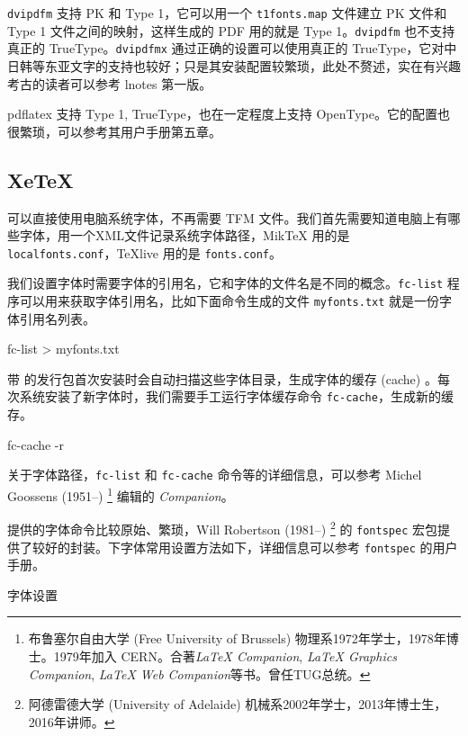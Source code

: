 \texttt{dvipdfm} 支持 PK 和 Type 1，它可以用一个 \texttt{t1fonts.map} 文件建立 PK 文件和 Type 1 文件之间的映射，这样生成的 PDF 用的就是 Type 1。\texttt{dvipdfm} 也不支持真正的 TrueType。\texttt{dvipdfmx} 通过正确的设置可以使用真正的 TrueType，它对中日韩等东亚文字的支持也较好；只是其安装配置较繁琐，此处不赘述，实在有兴趣考古的读者可以参考 lnotes 第一版\citep{Huang_lnotes}。

pdflatex 支持 Type 1, TrueType，也在一定程度上支持 OpenType。它的配置也很繁琐，可以参考其用户手册\citep{Han_pdftex}第五章。

\subsection{XeTeX}

\XeTeX 可以直接使用电脑系统字体，不再需要 TFM 文件。我们首先需要知道电脑上有哪些字体，\XeTeX 用一个XML文件记录系统字体路径，MikTeX 用的是 \texttt{localfonts.conf}，TeXlive 用的是 \texttt{fonts.conf}。

我们设置字体时需要字体的引用名，它和字体的文件名是不同的概念。\texttt{fc-list} 程序可以用来获取字体引用名，比如下面命令生成的文件 \texttt{myfonts.txt} 就是一份字体引用名列表。

\begin{Code}[]
fc-list > myfonts.txt
\end{Code}

带 \XeTeX 的发行包首次安装时会自动扫描这些字体目录，生成字体的缓存 (cache) 。每次系统安装了新字体时，我们需要手工运行字体缓存命令 \texttt{fc-cache}，生成新的缓存。

\begin{Code}[]
fc-cache -r
\end{Code}

关于字体路径，\texttt{fc-list} 和 \texttt{fc-cache} 命令等的详细信息，可以参考 Michel Goossens (1951--)\indexGoossens{} \footnote{布鲁塞尔自由大学 (Free University of Brussels) 物理系1972年学士，1978年博士。1979年加入 CERN。合著\emph{\LaTeX{} Companion}, \emph{\LaTeX{} Graphics Companion}, \emph{\LaTeX{} Web Companion}等书。曾任TUG总统。} 编辑的\emph{\XeTeX{} Companion}\citep{Goossens_xetex}。

\XeTeX 提供的字体命令比较原始、繁琐，Will Robertson (1981--)\indexRobertson{} \footnote{阿德雷德大学 (University of Adelaide) 机械系2002年学士，2013年博士生，2016年讲师。} 的 \texttt{fontspec} 宏包提供了较好的封装。\XeLaTeX 下字体常用设置方法如下，详细信息可以参考 \texttt{fontspec} 的用户手册\citep{Robertson_fontspec}。

\begin{example}[h]
\begin{Code}[]
\usepackage{fontspec}
\setmainfont[Mapping=tex-text]{Times New Roman}
\setsansfont[Mapping=tex-text]{Tahoma}
\setmonofont{Courier New}
\end{Code}
\caption{\XeLaTeX 字体设置}
\label{exa:xelatex_font}
\end{example}

